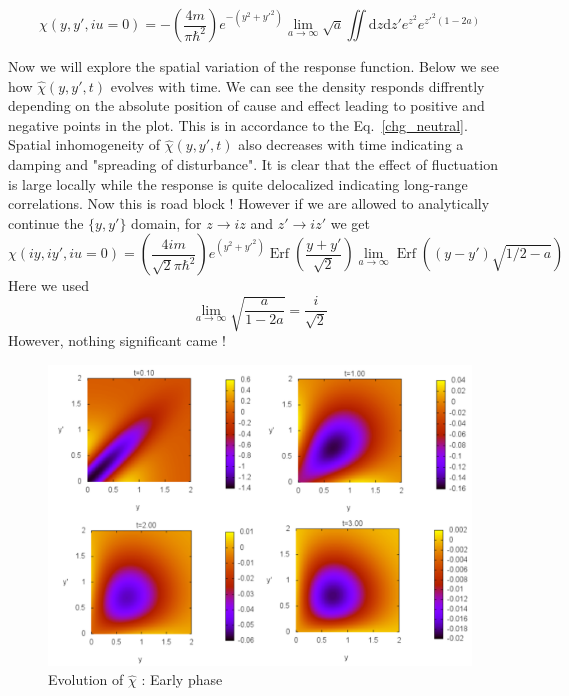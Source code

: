 \documentclass[jcp,groupaddress]{revtex4-1}
\newcommand{\eq}{\begin{equation}}
\newcommand{\qe}{\end{equation}}
\DeclareMathOperator{\erf}{Erf}
\newcommand{\lp}{\left(}
\newcommand{\rp}{\right)}
\newcommand{\diff}{\mathrm{d}}
\begin{document}
\eq
\chi(y, y', i u=0)= -\left( \frac{4m}{\pi \hbar^2}\right) e^{-(y^2+{y'}^2)} \lim_{a \to \infty} \sqrt{a} \iint \diff z \diff z' e^{z^2}e^{{z'}^2 \lp 1-2a\rp}
\qe

Now we will explore the spatial variation of the response function. Below we see how $\hat{\chi}(y, y',t)$ evolves with time. We can see the density responds diffrently depending on the absolute position of cause and effect leading to positive and negative points in the plot. This is in accordance to the Eq.~\eqref{chg_neutral}. Spatial inhomogeneity of $\hat{\chi}(y, y',t)$ also decreases with time indicating a damping and "spreading of disturbance". It is clear that the effect of fluctuation is large locally while the response is quite delocalized indicating long-range correlations.
Now this is road block ! However if we are allowed to analytically continue the $\{y, y'\}$ domain, for $z \rightarrow i z $ and $z' \rightarrow i z' $ we get 
\eq
\chi(iy, iy', iu = 0) = \lp\frac{4im}{\sqrt{2}\pi \hbar^2} \rp e^{(y^2+{y'}^2)}\erf\lp {\frac{y+y'}{\sqrt{2}}}\rp \lim_{a \to \infty} \erf\lp\lp y-y' \rp\sqrt{1/2-a}\rp
\qe
Here we used 
\eq
\lim_{a \to \infty}\sqrt{\frac{a}{1-2a}} = \frac{i}{\sqrt{2}} 
\qe
However, nothing significant came ! 
\begin{figure}[H]
\begin{center} 
   \includegraphics[scale=0.4]{plots/Plotpanel1.pdf} 
  \caption{Evolution of $\hat{\chi}$ : Early phase}
  \label{Panel1}
 \end{center}
\end{figure}  
\end{document}
